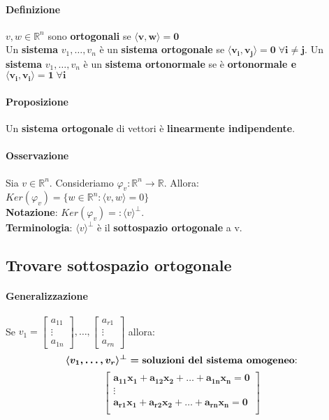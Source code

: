 \documentclass[a4paper, 12pt]{report}
\begin{document}
        \paragraph{Definizione} $v,w \in \mathbb{R}^n$ sono \textbf{ortogonali} se $\boldsymbol{\langle v,w \rangle=0}$\\
        Un \textbf{sistema} $v_1,\dots,v_n$ è un \textbf{sistema ortogonale} se $\boldsymbol{\langle v_i,v_j \rangle = 0 \; \forall i\neq j}$. 
        Un \textbf{sistema} $v_1,\dots,v_n$ è un \textbf{sistema ortonormale} se è \textbf{ortonormale e} $\boldsymbol{\langle v_i,v_i \rangle =1 \; \forall i}$
        \paragraph{Proposizione} Un \textbf{sistema ortogonale} di vettori è \textbf{linearmente indipendente}.
        \paragraph{Osservazione} Sia $v \in \mathbb{R}^n$. Consideriamo $\varphi_v:\mathbb{R}^n \rightarrow \mathbb{R}$. Allora:\\
        $Ker(\varphi_v)=\{w \in \mathbb{R}^n: \langle v,w \rangle =0 \}$\\
        \textbf{Notazione}: $Ker(\varphi_v)=:\langle v \rangle^\perp$.\\
        \textbf{Terminologia}: $\langle v \rangle^\perp$ è il \textbf{sottospazio ortogonale} a v.
        \subsection{Trovare sottospazio ortogonale}
        \paragraph{Generalizzazione} Se $v_1=
        \begin{bmatrix}
            a_{11}\\
            \vdots\\
            a_{1n}
        \end{bmatrix},\dots,
        \begin{bmatrix}
            a_{r1}\\
            \vdots\\
            a_{rn}
        \end{bmatrix}$ allora:
        $$\boldsymbol{\langle v_1,\dots,v_r \rangle^\perp = \text{\textbf{soluzioni del sistema omogeneo}:}}$$ 
        $$\boldsymbol{\begin{bmatrix}
            a_{11}x_1+a_{12}x_2+\dots+a_{1n}x_n=0\\
            \vdots\\
            a_{r1}x_1+a_{r2}x_2+\dots+a_{rn}x_n=0\\
        \end{bmatrix}}$$
\end{document}
